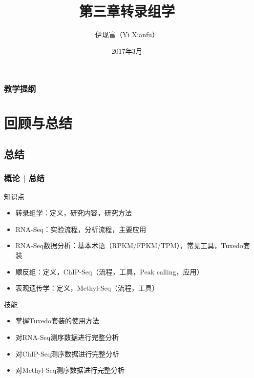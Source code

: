 



\title[转录组学]{第三章\quad 转录组学}
\author[Yixf]{伊现富（Yi Xianfu）}
\date{2017年3月}


\begin{frame}[label=current]
  \titlepage
\end{frame}

\begin{frame}[plain,label=current]
  \frametitle{教学提纲}
  \setcounter{tocdepth}{3}
  \begin{multicols}{2}
    \tableofcontents
  \end{multicols}
\end{frame}








\section{回顾与总结}
\subsection{总结}
\begin{frame}[label=current]
  \frametitle{概论 | 总结}
  \begin{block}{知识点}
    \begin{itemize}
      \item 转录组学：定义，研究内容，研究方法
      \item RNA-Seq：实验流程，分析流程，主要应用
      \item RNA-Seq数据分析：基本术语（RPKM/FPKM/TPM），常见工具，Tuxedo套装
      \item 顺反组：定义，ChIP-Seq（流程，工具，Peak calling，应用）
      \item 表观遗传学：定义，Methyl-Seq（流程，工具）
    \end{itemize}
  \end{block}
  \begin{block}{技能}
    \begin{itemize}
      \item 掌握Tuxedo套装的使用方法
      \item 对RNA-Seq测序数据进行完整分析
      \item 对ChIP-Seq测序数据进行完整分析
      \item 对Methyl-Seq测序数据进行完整分析
    \end{itemize}
  \end{block}
\end{frame}

